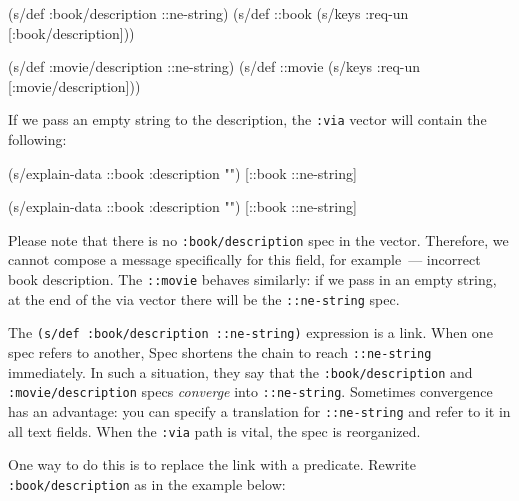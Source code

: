 \else

\begin{english}
  \begin{clojure}
(s/def :book/description ::ne-string)
(s/def ::book (s/keys :req-un [:book/description]))

(s/def :movie/description ::ne-string)
(s/def ::movie (s/keys :req-un [:movie/description]))
  \end{clojure}
\end{english}

\fi

If we pass an empty string to the description, the \verb|:via| vector will contain the following:

\ifx\DEVICETYPE\MOBILE

\begin{english}
  \begin{clojure}
(s/explain-data ::book
  {:description ""})
[::book ::ne-string]
  \end{clojure}
\end{english}

\else

\begin{english}
  \begin{clojure}
(s/explain-data ::book {:description ""})
[::book ::ne-string]
  \end{clojure}
\end{english}

\fi

Please note that there is no \texttt{:book/de\-scription} spec in the vector. Therefore, we cannot compose a message specifically for this field, for example~--- incorrect book description. The \verb|::movie| behaves similarly: if we pass in an empty string, at the end of the via vector there will be the \verb|::ne-string| spec.

The \texttt{(s/def :book/description ::ne\--string)} expression is a link. When one spec refers to another, Spec shortens the chain to reach \verb|::ne-string| immediately. In such a situation, they say that the \verb|:book/description| and \verb|:movie/description| specs \emph{converge} into \verb|::ne-string|. Sometimes convergence has an advantage: you can specify a translation for \verb|::ne-string| and refer to it in all text fields. When the \verb|:via| path is vital, the spec is reorganized.

One way to do this is to replace the link with a predicate. Rewrite \verb|:book/description| as in the example below:


